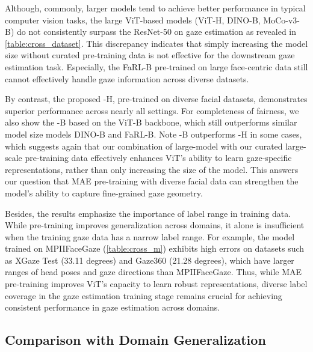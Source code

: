Although, commonly, larger models tend to achieve better performance in typical computer vision tasks, the large ViT-based models (ViT-H, DINO-B, MoCo-v3-B) do not consistently surpass the ResNet-50 on gaze estimation as revealed in \cref{table:cross_dataset}.
This discrepancy indicates that simply increasing the model size without curated pre-training data is not effective for the downstream gaze estimation task.
Especially, the FaRL-B pre-trained on large face-centric data still cannot effectively handle gaze information across diverse datasets. 


By contrast, the proposed \methodname-H, pre-trained on diverse facial datasets, demonstrates superior performance across nearly all settings. 
For completeness of fairness, we also show the \methodname-B based on the ViT-B backbone, which still outperforms similar model size models DINO-B and FaRL-B.
Note \methodname-B outperforms \methodname-H in some cases, which suggests again that our combination of large-model with our curated large-scale pre-training data effectively enhances ViT's ability to learn gaze-specific representations, rather than only increasing the size of the model. 
This answers our question that MAE pre-training with diverse facial data can strengthen the model's ability to capture fine-grained gaze geometry.

Besides, the results emphasize the importance of label range in training data.
While pre-training improves generalization across domains, it alone is insufficient when the training gaze data has a narrow label range.
For example, the model trained on MPIIFaceGaze (\cref{table:cross_m}) exhibits high errors on datasets such as XGaze Test (33.11 degrees) and Gaze360 (21.28 degrees), which have larger ranges of head poses and gaze directions than MPIIFaceGaze.
Thus, while MAE pre-training improves ViT's capacity to learn robust representations, diverse label coverage in the gaze estimation training stage remains crucial for achieving consistent performance in gaze estimation across domains.


\subsection{Comparison with Domain Generalization}\label{sec:domain_generalization}

